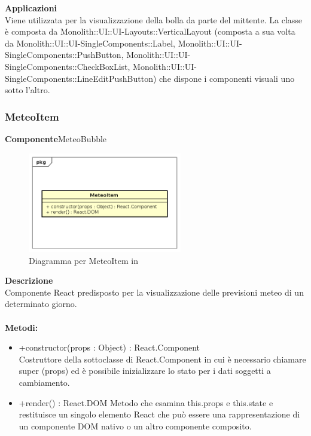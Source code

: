 \textbf{Applicazioni}\\
Viene utilizzata per la visualizzazione della bolla da parte del mittente.
La classe è composta da Monolith::UI::UI-Layouts::VerticalLayout (composta a sua volta da Monolith::UI::UI-SingleComponents::Label, Monolith::UI::UI-SingleComponents::PushButton, Monolith::UI::UI-SingleComponents::CheckBoxList, Monolith::UI::UI-SingleComponents::LineEditPushButton) che dispone i componenti visuali uno sotto l'altro. 


\clearpage

\subsubsection{MeteoItem}
\textbf{Componente}MeteoBubble\\
   \FloatBarrier
   \begin{figure}[ht]
   \centering
   \includegraphics[width=0.6\textwidth]{img/single-MeteoItem}
   \caption{{Diagramma per MeteoItem in }}
\end{figure}
\FloatBarrier
\textbf{Descrizione}\\
Componente React predisposto per la visualizzazione delle previsioni meteo di un determinato giorno.
\\
\\
\textbf{Metodi:} 
\begin{itemize}
\item +constructor(props : Object) : React.Component 
\\
Costruttore della sottoclasse di React.Component in cui è necessario chiamare super (props) ed è possibile inizializzare lo stato per i dati soggetti a cambiamento.

\item +render() : React.DOM
Metodo che esamina this.props e this.state e restituisce un singolo elemento React che può essere una rappresentazione di un componente DOM nativo o un altro componente composito.

\end{itemize} 


